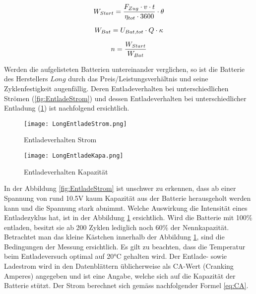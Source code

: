 \begin{equation}
\centering
	W_{Start}=\frac{F_{Zug}\cdot v \cdot t}{\eta_{tot}\cdot 3600}\cdot \theta
\label{eq:EnergieStart}
\end{equation}

\begin{equation}
\centering
	W_{Bat}=U_{Bat,tot}\cdot Q \cdot \kappa
\label{eq:EnergieBatterie}
\end{equation}

\begin{equation}
\centering
	n=\frac{W_{Start}}{W_{Bat}}
\label{eq:AnzahlStarts}
\end{equation}


Werden die aufgelisteten Batterien untereinander verglichen, so ist die Batterie des Herstellers $Long$ durch das Preis/Leistungsverhältnis und seine Zyklenfestigkeit augenfällig. Deren Entladeverhalten bei unterschiedlichen Strömen (\ref{fig:EntladeStrom}) und dessen Entladeverhalten bei unterschiedlicher Entladung (\ref{fig:EntladeKapazität}) ist nachfolgend ersichtlich. 


\begin{figure}[H]
	\centering
	\begin{minipage}[h]{.48\linewidth} %
		\centering
		\texttt{[image: LongEntladeStrom.png]}
		\caption[Batterie Entladeverhalten Strom]{Entladeverhalten Strom}
		\label{fig:EntladeStrom}
	\end{minipage}
	\quad %
	\begin{minipage}[h]{.48\linewidth} %
		\centering
		\texttt{[image: LongEntladeKapa.png]}
		\caption[Batterie Entladeverhalten Kapazität]{Entladeverhalten Kapazität}
		\label{fig:EntladeKapazität}
	\end{minipage}
\end{figure}

In der Abbildung \ref{fig:EntladeStrom} ist unschwer zu erkennen, dass ab einer Spannung von rund 10.5V kaum Kapazität aus der Batterie herausgeholt werden kann und die Spannung stark abnimmt. Welche Auswirkung die Intensität eines Entladezyklus hat, ist in der Abbildung \ref{fig:EntladeKapazität} ersichtlich. Wird die Batterie mit 100\% entladen, besitzt sie ab 200 Zyklen lediglich noch 60\% der Nennkapazität. Betrachtet man das kleine Kästchen innerhalb der Abbildung \ref{fig:EntladeKapazität}, sind die Bedingungen der Messung ersichtlich. Es gilt zu beachten, dass die Temperatur beim Entladeversuch optimal auf 20°C gehalten wird. Der Entlade- sowie Ladestrom wird in den Datenblättern üblicherweise als CA-Wert (Cranking Amperes) angegeben und ist eine Angabe, welche sich auf die Kapazität der Batterie stützt. Der Strom berechnet sich gemäss nachfolgender Formel \ref{eq:CA}.

